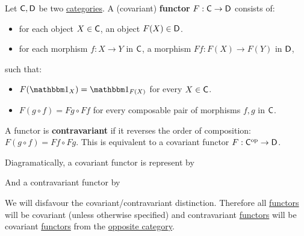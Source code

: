 \documentclass[../../main]{subfiles}
\begin{document}
\begin{definition}[Functor]\label{def:functor}
  Let \(\mathsf{C}, \mathsf{D}\) be two \hyperref[def:category]{categories}.
  A (covariant) \textbf{functor} \(F: \mathsf{C} \to \mathsf{D}\) consists of:
  \begin{itemize}
    \item for each object \(X \in \mathsf{C}\), an object \(F(X) \in \mathsf{D}\).
    \item for each morphism \(f: X \to Y\) in \(\mathsf{C}\), a morphism \(Ff: F(X) \to F(Y)\) in \(\mathsf{D}\),
  \end{itemize}
  such that:
  \begin{itemize}
    \item \(F(\id_X) = \id_{F(X)}\) for every \(X \in \mathsf{C}\).
    \item \(F(g \circ f) = Fg \circ Ff\) for every composable pair of morphisms \(f, g\) in \(\mathsf{C}\).
  \end{itemize}

  A functor is \textbf{contravariant} if it reverses the order of composition: \(F(g \circ f) = Ff \circ Fg\). This is equivalent to a covariant functor \(F: \mathsf{C}^{\operatorname*{op}} \to \mathsf{D}\).

  Diagramatically, a covariant functor is represent by
  \begin{center}
  \end{center}
  And a contravariant functor by
  \begin{center}
  \end{center}
\end{definition}

\begin{remark}
  We will disfavour the covariant/contravariant distinction.
  Therefore all \hyperref[def:functor]{functors} will be covariant (unless otherwise specified) and contravariant \hyperref[def:functor]{functors} will be covariant \hyperref[def:functor]{functors} from the \hyperref[def:opposite-category]{opposite category}.
\end{remark}
\end{document}
